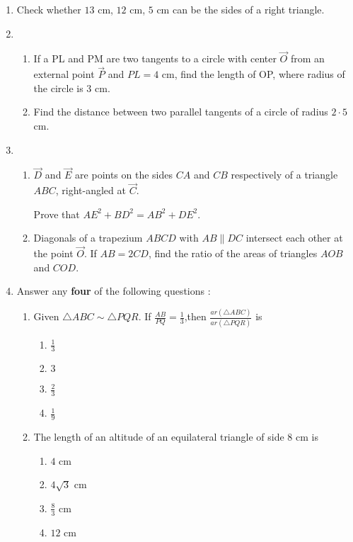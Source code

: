 \begin{enumerate}
\item Check whether $13$ cm, $12$ cm, $5$ cm can be the sides of a right triangle.
\item 
\begin{enumerate}
    \item If a PL and PM are two tangents to a circle with center $\vec{O}$ from an external point $\vec{P}$ and $PL=4$ cm, find the length of OP, where radius of the circle is $3$ cm.
    \item Find the distance between two parallel tangents of a circle of radius $2\cdot5$ cm.
\end{enumerate}
    \item 
    \begin{enumerate}
    \item $\vec{D}$ and $\vec{E}$ are points on the sides $CA$ and $CB$ respectively of  a triangle $ABC$, right-angled at $\vec{C}$.
    
    Prove that $AE^2+BD^2=AB^2+DE^2$.
    
    \item Diagonals of a trapezium $ABCD$ with $AB\parallel DC$ intersect each other at the point $\vec{O}$. If $AB=2CD$, find the ratio of the areas of triangles $AOB$ and $COD$.
    \end{enumerate}

    \item Answer any \textbf{four} of the following questions :
      \begin{enumerate}[label=(\roman*)]
        \item Given $\triangle ABC \sim \triangle PQR$. If $\frac{AB}{PQ}=\frac{1}{3}$,then $\frac{ar(\triangle ABC)}{ar(\triangle PQR)}$ is 
        
        \begin{enumerate}[label=(\Alph*]
            \item $\frac{1}{3}$
            \item $3$
            \item $\frac{2}{3}$
            \item $\frac{1}{9}$
        \end{enumerate}
        
        \item The length of an altitude of an equilateral triangle of side $8$ cm is
        
          \begin{enumerate}[label=(\Alph*)]
            \item $4$ cm
            \item $4\sqrt{3}$ cm
            \item $\frac{8}{3}$ cm
            \item $12$ cm
        \end{enumerate}
        

\end{enumerate}
\end{enumerate}
